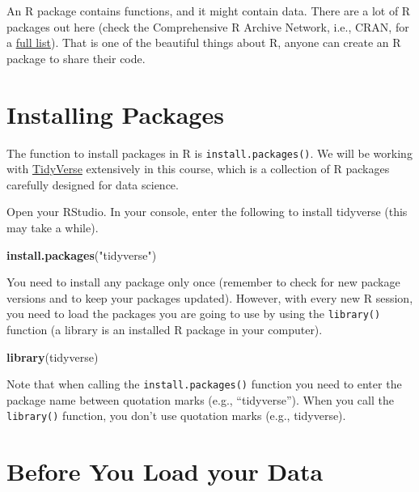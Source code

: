 \documentclass[
]{book}
\newenvironment{Shaded}{\begin{snugshade}}{\end{snugshade}}
\newcommand{\KeywordTok}[1]{\textcolor[rgb]{0.13,0.29,0.53}{\textbf{#1}}}
\newcommand{\NormalTok}[1]{#1}
\newcommand{\StringTok}[1]{\textcolor[rgb]{0.31,0.60,0.02}{#1}}
\begin{document}
An R package contains functions, and it might contain data. There are a lot of R packages out here (check the Comprehensive R Archive Network, i.e., CRAN, for a \href{https://cran.r-project.org/web/packages/available_packages_by_name.html}{full list}). That is one of the beautiful things about R, anyone can create an R package to share their code.

\hypertarget{installing-packages}{%
\section{Installing Packages}\label{installing-packages}}

The function to install packages in R is \texttt{install.packages()}. We will be working with \href{https://www.tidyverse.org/}{TidyVerse} extensively in this course, which is a collection of R packages carefully designed for data science.

Open your RStudio. In your console, enter the following to install tidyverse (this may take a while).

\begin{Shaded}
\begin{Highlighting}[]
\KeywordTok{install.packages}\NormalTok{(}\StringTok{"tidyverse"}\NormalTok{)}
\end{Highlighting}
\end{Shaded}

You need to install any package only once (remember to check for new package versions and to keep your packages updated). However, with every new R session, you need to load the packages you are going to use by using the \texttt{library()} function (a library is an installed R package in your computer).

\begin{Shaded}
\begin{Highlighting}[]
\KeywordTok{library}\NormalTok{(tidyverse)}
\end{Highlighting}
\end{Shaded}

Note that when calling the \texttt{install.packages()} function you need to enter the package name between quotation marks (e.g., ``tidyverse''). When you call the \texttt{library()} function, you don't use quotation marks (e.g., tidyverse).

\hypertarget{before-you-load-your-data}{%
\section{Before You Load your Data}\label{before-you-load-your-data}}
\end{document}
